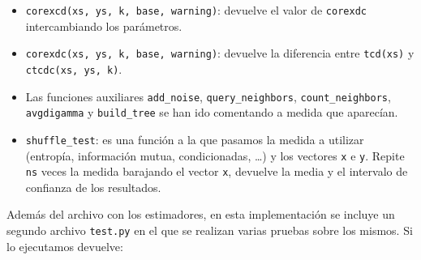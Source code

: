 \documentclass[12pt,a4paper]{report} %
\theoremstyle{definition}
\begin{document}
\begin{itemize}
\item \texttt{corexcd(xs, ys, k, base, warning)}: devuelve el valor de \texttt{corexdc} intercambiando los parámetros.

\item \texttt{corexdc(xs, ys, k, base, warning)}: devuelve la diferencia entre \texttt{tcd(xs)} y \texttt{ctcdc(xs, ys, k)}.

\item Las funciones auxiliares \texttt{add\_noise}, \texttt{query\_neighbors}, \texttt{count\_neighbors}, \texttt{avgdigamma} y \texttt{build\_tree} se han ido comentando a medida que aparecían.

\item \texttt{shuffle\_test}: es una función a la que pasamos la medida a utilizar (entropía, información mutua, condicionadas, \dots) y los vectores \texttt{x} e \texttt{y}. Repite \texttt{ns} veces la medida barajando el vector \texttt{x}, devuelve la media y el intervalo de confianza de los resultados.
\end{itemize}

Además del archivo con los estimadores, en esta implementación se incluye un segundo archivo \texttt{test.py} en el que se realizan varias pruebas sobre los mismos. Si lo ejecutamos devuelve:
\end{document}
